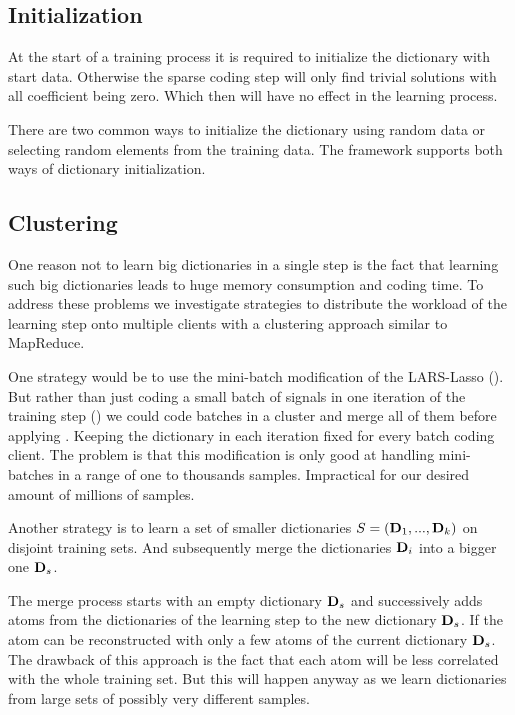 \subsection{Initialization}
At the start of a training process it is required to initialize the
dictionary with start data. Otherwise the sparse coding step will only find
trivial solutions with all coefficient being zero. Which then will have no
effect in the learning process.

There are two common ways to initialize the dictionary using random data or
selecting random elements from the training data. The framework supports 
both ways of dictionary initialization. 


\subsection{Clustering}
\label{sec:clustering}
One reason not to learn big dictionaries in a single step is the fact that
learning such big dictionaries leads to huge memory consumption and coding time.
To address these problems we investigate strategies to distribute the workload
of the learning step onto multiple clients with a clustering approach similar to
MapReduce. 

One strategy would be to use the mini-batch
modification of the LARS-Lasso (). But rather
than just coding a small batch of signals in one iteration of the training
step () we could code batches in 
a cluster and merge all of them before applying . Keeping
the dictionary in each iteration fixed for every batch coding client. The
problem is that this modification is only good at handling mini-batches in a
range of one to thousands samples. Impractical for our desired amount of
millions of samples.

Another strategy is to learn a set of smaller dictionaries $S =
(\boldsymbol{\mathrm{D}}_1, ..., \boldsymbol{\mathrm{D}}_k)$ on disjoint training sets. And subsequently merge
the dictionaries $\boldsymbol{\mathrm{D}}_i$ into a bigger one $\boldsymbol{\mathrm{D}}_{s}$. 

The merge process starts with an empty dictionary $\boldsymbol{\mathrm{D}}_{s}$ and
successively adds atoms from the dictionaries of the learning step to the new
dictionary $\boldsymbol{\mathrm{D}}_{s}$. If the atom can be reconstructed with only a few
atoms of the current dictionary $\boldsymbol{\mathrm{D}}_{s}$. 
The drawback of this approach is the fact that each atom will be less
correlated with the whole training set. But this will happen anyway as we learn
dictionaries from large sets of possibly very different samples. 

